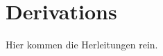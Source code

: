 \chapter[Derivations]{Derivations}%
\label{chap:AppendixDerivations}
%
Hier kommen die Herleitungen rein.